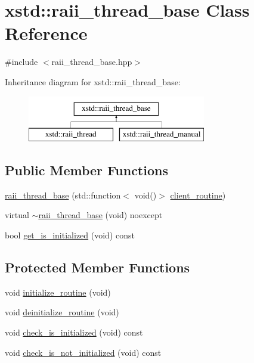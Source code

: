 \hypertarget{classxstd_1_1raii__thread__base}{\section{xstd\-:\-:raii\-\_\-thread\-\_\-base Class Reference}
\label{classxstd_1_1raii__thread__base}
}


{\ttfamily \#include $<$raii\-\_\-thread\-\_\-base.\-hpp$>$}

Inheritance diagram for xstd\-:\-:raii\-\_\-thread\-\_\-base\-:\begin{figure}[H]
\begin{center}
\leavevmode
\includegraphics[height=2.000000cm]{classxstd_1_1raii__thread__base}
\end{center}
\end{figure}
\subsection*{Public Member Functions}
\begin{DoxyCompactItemize}
\item 
\hyperlink{classxstd_1_1raii__thread__base_a8f6cf744a47869c0e28a5e8a127c172b}{raii\-\_\-thread\-\_\-base} (std\-::function$<$ void()$>$ \hyperlink{classxstd_1_1raii__thread__base_a6b3e160c7eb131008410a16c460b03ff}{client\-\_\-routine})
\item 
virtual \hyperlink{classxstd_1_1raii__thread__base_a41c504ee2653958528c5e04b3239041e}{$\sim$raii\-\_\-thread\-\_\-base} (void) noexcept
\item 
bool \hyperlink{classxstd_1_1raii__thread__base_a9657cb2eddab6ef67b8884bff38ccbcb}{get\-\_\-is\-\_\-initialized} (void) const 
\end{DoxyCompactItemize}
\subsection*{Protected Member Functions}
\begin{DoxyCompactItemize}
\item 
void \hyperlink{classxstd_1_1raii__thread__base_ad3b035606a096d6117de8de40c665507}{initialize\-\_\-routine} (void)
\item 
void \hyperlink{classxstd_1_1raii__thread__base_ae423d8023eb8c3bed9b4b0f11c055c2d}{deinitialize\-\_\-routine} (void)
\item 
void \hyperlink{classxstd_1_1raii__thread__base_aef97fe42b58be66ddd0bf90462b772a8}{check\-\_\-is\-\_\-initialized} (void) const 
\item 
void \hyperlink{classxstd_1_1raii__thread__base_a6a179dd57da4ec48177c0cd38da0702e}{check\-\_\-is\-\_\-not\-\_\-initialized} (void) const 
\end{DoxyCompactItemize}
